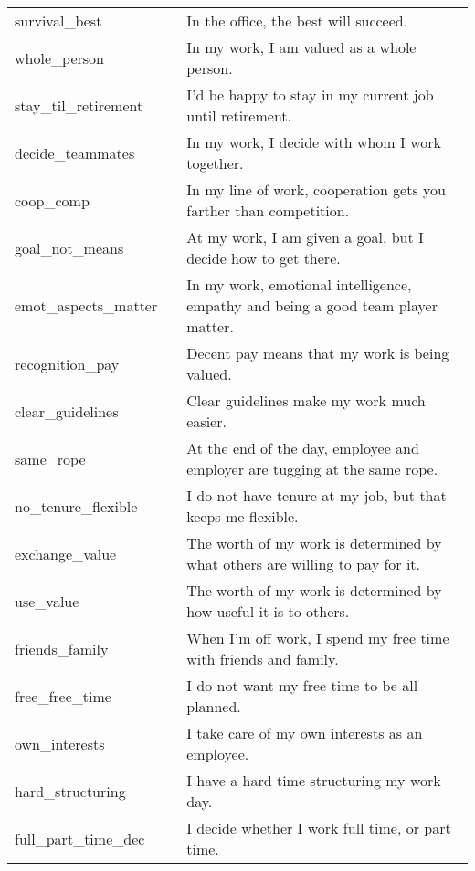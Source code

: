 \documentclass[a4paper,12pt]{article}\usepackage[]{graphicx}\usepackage[]{color}
\begin{document}
\begin{longtable}{H{72mm}m{0mm}m{75mm}}
  survival{\_{}}best & \rule[-27mm]{0mm}{54mm} & In the office, the best will succeed. \\
  whole{\_{}}person & \rule[-27mm]{0mm}{54mm} & In my work, I am valued as a whole person. \\
  stay{\_{}}til{\_{}}retirement & \rule[-27mm]{0mm}{54mm} & I’d be happy to stay in my current job until retirement. \\
  decide{\_{}}teammates & \rule[-27mm]{0mm}{54mm} & In my work, I decide with whom I work together. \\
  coop{\_{}}comp & \rule[-27mm]{0mm}{54mm} & In my line of work, cooperation gets you farther than competition. \\
  goal{\_{}}not{\_{}}means & \rule[-27mm]{0mm}{54mm} & At my work, I am given a goal, but I decide how to get there. \\
  emot{\_{}}aspects{\_{}}matter & \rule[-27mm]{0mm}{54mm} & In my work, emotional intelligence, empathy and being a good team player matter. \\
  recognition{\_{}}pay & \rule[-27mm]{0mm}{54mm} & Decent pay means that my work is being valued. \\
  clear{\_{}}guidelines & \rule[-27mm]{0mm}{54mm} & Clear guidelines make my work much easier. \\
  same{\_{}}rope & \rule[-27mm]{0mm}{54mm} & At the end of the day, employee and employer are tugging at the same rope. \\
  no{\_{}}tenure{\_{}}flexible & \rule[-27mm]{0mm}{54mm} & I do not have tenure at my job, but that keeps me flexible. \\
  exchange{\_{}}value & \rule[-27mm]{0mm}{54mm} & The worth of my work is determined by what others are willing to pay for it. \\
  use{\_{}}value & \rule[-27mm]{0mm}{54mm} & The worth of my work is determined by how useful it is to others. \\
  friends{\_{}}family & \rule[-27mm]{0mm}{54mm} & When I’m off work, I spend my free time with friends and family. \\
  free{\_{}}free{\_{}}time & \rule[-27mm]{0mm}{54mm} & I do not want my free time to be all planned. \\
  own{\_{}}interests & \rule[-27mm]{0mm}{54mm} & I take care of my own interests as an employee. \\
  hard{\_{}}structuring & \rule[-27mm]{0mm}{54mm} & I have a hard time structuring my work day. \\
  full{\_{}}part{\_{}}time{\_{}}dec & \rule[-27mm]{0mm}{54mm} & I decide whether I work full time, or part time. \\

\end{longtable}
\end{document}
